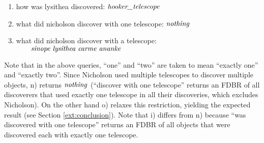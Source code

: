\documentclass[../main.tex]{subfiles}
\begin{document}
\begin{refsection}
\begin{enumerate}[label=\alph*.]
	\item how was lysithea discovered: $\textit{hooker\_telescope}$
	\item what did nicholson discover with one telescope: $\textit{nothing}$
	\item what did nicholson discover with a telescope: \\ $\textit{\qquad sinope lysithea carme ananke}$
\end{enumerate}
%
Note that in the above queries, ``one'' and ``two'' are taken to mean ``exactly one'' and ``exactly two''. Since Nicholson used multiple telescopes to discover multiple objects, n) returns $\operatorname{\mathit{nothing}}$ (``discover with one telescope'' returns an FDBR of all discoverers that used exactly one telescope in all their discoveries, which excludes Nicholson). On the other hand o) relaxes this restriction, yielding the expected result (see Section \ref{ext:conclusion}).  Note that i) differs from n) because ``was discovered with one telescope'' returns an FDBR of all objects that were discovered each with exactly one telescope.


\end{refsection}
\end{document}
